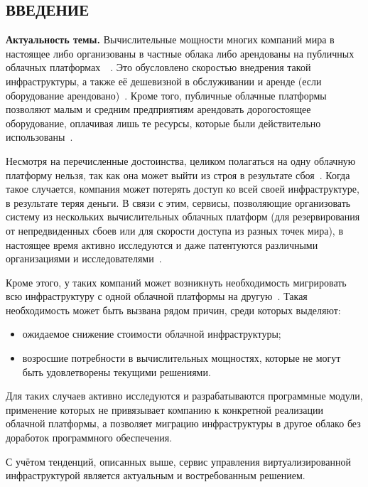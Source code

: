 \begin{center}
\section*{ВВЕДЕНИЕ}
\end{center}
\textbf{Актуальность темы.}
Вычислительные мощности многих компаний мира в настоящее либо организованы в частные облака либо арендованы на публичных облачных платформах~\cite{fake-11}~\cite{fake-15}. 
Это обусловлено скоростью внедрения такой инфраструктуры, а также её дешевизной в обслуживании и аренде (если оборудование арендовано)~\cite{fake-14}.
Кроме того, публичные облачные платформы позволяют малым и средним предприятиям арендовать дорогостоящее оборудование, оплачивая лишь те ресурсы, которые были действительно использованы~\cite{fake-13}.

Несмотря на перечисленные достоинства, целиком полагаться на одну облачную платформу нельзя, так как она может выйти из строя в результате сбоя~\cite{fake-12}.
Когда такое случается, компания может потерять доступ ко всей своей инфраструктуре, в результате теряя деньги.
В связи с этим, сервисы, позволяющие организовать систему из нескольких вычислительных облачных платформ (для резервирования от непредвиденных сбоев или для скорости доступа из разных точек мира), в настоящее время активно исследуются и даже патентуются различными организациями и исследователями~\cite{fake-18}.

Кроме этого, у таких компаний может возникнуть необходимость мигрировать всю инфраструктуру с одной облачной платформы на другую~\cite{fake-21}.
Такая необходимость может быть вызвана рядом причин, среди которых выделяют:
\begin{itemize}
    \item ожидаемое снижение стоимости облачной инфраструктуры;
    \item возросшие потребности в вычислительных мощностях, которые не могут быть удовлетворены текущими решениями.
\end{itemize}
Для таких случаев активно исследуются и разрабатываются программные модули, применение которых не привязывает компанию к конкретной реализации облачной платформы, а позволяет миграцию инфраструктуры в другое облако без доработок программного обеспечения.

С учётом тенденций, описанных выше, сервис управления виртуализированной инфраструктурой является актуальным и востребованным решением.

